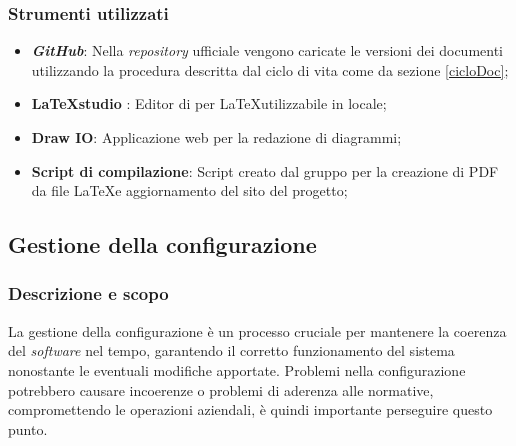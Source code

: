 \documentclass[5pt]{article}
\begin{document}
\subsubsection{Strumenti utilizzati}
\begin{itemize}
	\item \textbf{\textit{GitHub}}:	Nella \textit{repository} ufficiale vengono caricate le versioni dei documenti utilizzando la procedura descritta dal ciclo di vita come da sezione \ref{cicloDoc};
	\item \textbf{\LaTeX \space studio }: Editor di per \LaTeX utilizzabile in locale;
	\item \textbf{Draw IO}: Applicazione web per la redazione di diagrammi;
	\item \textbf{Script di compilazione}: Script creato dal gruppo per la creazione di PDF da file \LaTeX e aggiornamento del sito del progetto;
\end{itemize}



\subsection{Gestione della configurazione}

    \subsubsection{Descrizione e scopo}
    La gestione della configurazione è un processo cruciale per mantenere la coerenza del \textit{software} nel tempo, garantendo il corretto funzionamento del sistema nonostante le eventuali modifiche apportate. Problemi nella configurazione potrebbero causare incoerenze o problemi di aderenza alle normative, compromettendo le operazioni aziendali, è quindi importante perseguire questo punto.
    
\end{document}
